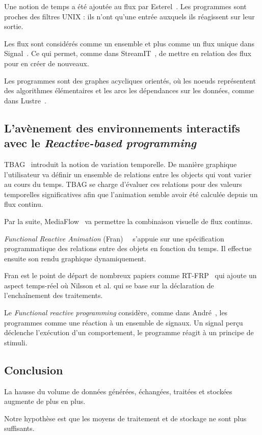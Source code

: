 \documentclass{llncs}
\newcommand{\RP}{\emph{Reactive-based programming} }
\newcommand{\FRP}{\emph{Functional reactive programming} }
\begin{document}
Une notion de temps a été ajoutée au flux par Esterel~\cite{Berry84}.
Les programmes sont proches des filtres UNIX : ils n'ont qu'une entrée auxquels
ils réagissent sur leur sortie.

Les flux sont considérés comme un ensemble et plus comme un flux unique dans Signal~\cite{Benveniste85}.
Ce qui permet, comme dans StreamIT~\cite{Thies02}, de mettre en relation des flux
pour en créer de nouveaux.

Les programmes sont des graphes acycliques orientés, où les noeuds représentent des
algorithmes élémentaires et les arcs les dépendances sur les données, comme dans
Lustre~\cite{Caspi87}.

\subsection{L'avènement des environnements interactifs avec le \RP}
TBAG~\cite{Elliott94} introduit la notion de variation temporelle.
De manière graphique l'utilisateur va définir un ensemble de relations
entre les objects qui vont varier au cours du temps.
TBAG se charge d'évaluer ces relations pour des valeurs temporelles
significatives afin que l'animation semble avoir été calculée depuis
un flux continu.

Par la suite, MediaFlow~\cite{Elliott95} va permettre la combinaison visuelle
de flux continus.

\emph{Functional Reactive Animation} (Fran)~\cite{Elliott97}~\cite{Elliott98}
s'appuie sur une spécification programmatique des relations entre des objets
en fonction du temps.
Il effectue ensuite son rendu graphique dynamiquement.

Fran est le point de départ de nombreux papiers comme RT-FRP~\cite{Wan02}
qui ajoute un aspect temps-réel où Nilsson et al.\cite{Nilsson2002a} qui se base
sur la déclaration de l'enchaînement des traitements.

Le \FRP considère, comme dans André~\cite{Andre96}, les programmes comme
une réaction à un ensemble de signaux. Un signal perçu déclenche l'exécution
d'un comportement, le programme réagit à un principe de stimuli.

\subsection{Conclusion}
La hausse du volume de données générées, échangées, traitées et stockées augmente de
plus en plus.

Notre hypothèse est que les moyens de traitement et de stockage ne sont plus
suffisants.
\end{document}
